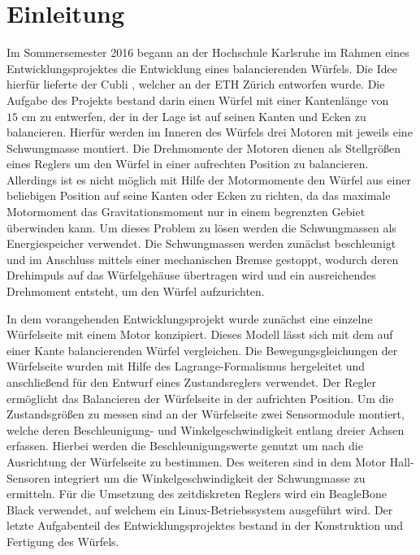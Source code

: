 \chapter{Einleitung}
Im Sommersemester 2016 begann an der Hochschule Karlsruhe im Rahmen eines Entwicklungsprojektes die Entwicklung eines balancierenden Würfels. Die Idee hierfür lieferte der Cubli \cite{Cubli1}, welcher an der ETH Zürich entworfen wurde. Die Aufgabe des Projekts bestand darin einen Würfel mit einer Kantenlänge von $15\text{ cm}$ zu entwerfen, der in der Lage ist auf seinen Kanten und Ecken zu balancieren. Hierfür werden im Inneren des Würfels drei Motoren mit jeweils eine Schwungmasse montiert. Die Drehmomente der Motoren dienen als Stellgrößen eines Reglers um den Würfel in einer aufrechten Position zu balancieren. Allerdings ist es nicht möglich mit Hilfe der Motormomente den Würfel aus einer beliebigen Position auf seine Kanten oder Ecken zu richten, da das maximale Motormoment das Gravitationsmoment nur in einem begrenzten Gebiet überwinden kann. Um dieses Problem zu lösen werden die Schwungmassen als Energiespeicher verwendet. Die Schwungmassen werden zunächst beschleunigt und im Anschluss mittels einer mechanischen Bremse gestoppt, wodurch deren Drehimpuls auf das Würfelgehäuse übertragen wird und ein ausreichendes Drehmoment entsteht, um den Würfel aufzurichten.

In dem vorangehenden Entwicklungsprojekt wurde zunächst eine einzelne Würfelseite mit einem Motor konzipiert. Dieses Modell lässt sich mit dem auf einer Kante balancierenden Würfel vergleichen. Die Bewegungsgleichungen der Würfelseite wurden mit Hilfe des Lagrange-Formalismus hergeleitet und anschließend für den Entwurf eines Zustandsreglers verwendet. Der Regler ermöglicht das Balancieren der Würfelseite in der aufrichten Position. Um die Zustandsgrößen zu messen sind an der Würfelseite zwei Sensormodule montiert, welche deren Beschleunigung- und Winkelgeschwindigkeit entlang dreier Achsen erfassen. Hierbei werden die Beschleunigungswerte genutzt um nach \cite{Cubli1} die Ausrichtung der Würfelseite zu bestimmen. Des weiteren sind in dem Motor Hall-Sensoren integriert um die Winkelgeschwindigkeit der Schwungmasse zu ermitteln. Für die Umsetzung des zeitdiskreten Reglers wird ein BeagleBone Black verwendet, auf welchem ein Linux-Betriebssystem ausgeführt wird. Der letzte Aufgabenteil des Entwicklungsprojektes bestand in der Konstruktion und Fertigung des Würfels.

